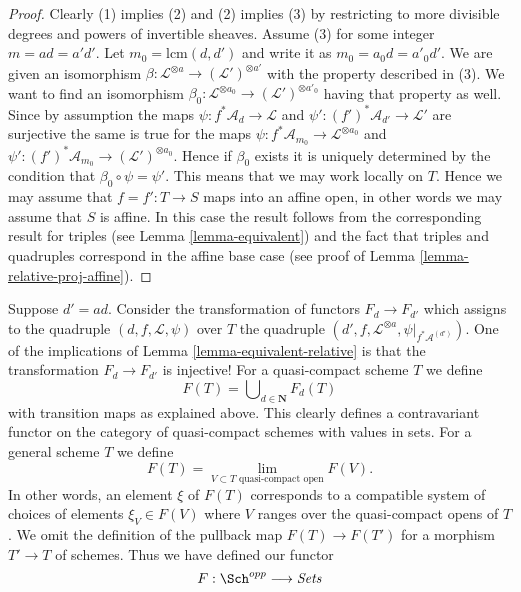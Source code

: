 \begin{proof}
Clearly (1) implies (2) and (2) implies (3) by restricting to
more divisible degrees and powers of invertible sheaves.
Assume (3) for some integer $m = ad = a'd'$. Let
$m_0 = \text{lcm}(d, d')$ and write it as $m_0 = a_0d = a'_0d'$.
We are given an isomorphism
$\beta : \mathcal{L}^{\otimes a} \to (\mathcal{L}')^{\otimes a'}$
with the property described in (3). We want to find an isomorphism
$\beta_0 : \mathcal{L}^{\otimes a_0} \to (\mathcal{L}')^{\otimes a'_0}$
having that property as well.
Since by assumption the maps $\psi : f^*\mathcal{A}_d \to \mathcal{L}$
and $\psi' : (f')^*\mathcal{A}_{d'} \to \mathcal{L}'$ are surjective the
same is true for the maps
$\psi : f^*\mathcal{A}_{m_0} \to \mathcal{L}^{\otimes a_0}$
and $\psi' : (f')^*\mathcal{A}_{m_0} \to (\mathcal{L}')^{\otimes a_0}$.
Hence if $\beta_0$ exists it is uniquely determined by the
condition that $\beta_0 \circ \psi = \psi'$. This means that
we may work locally on $T$. Hence we may assume that
$f = f' : T \to S$ maps into an affine open, in other words
we may assume that $S$ is affine. In this case the result follows
from the corresponding result for triples (see Lemma \ref{lemma-equivalent})
and the fact that triples and quadruples correspond in the
affine base case (see proof of Lemma \ref{lemma-relative-proj-affine}).
\end{proof}

\noindent
Suppose $d' = ad$. Consider the transformation of functors $F_d \to F_{d'}$
which assigns to the quadruple $(d, f, \mathcal{L}, \psi)$ over
$T$ the quadruple
$(d', f, \mathcal{L}^{\otimes a}, \psi|_{f^*\mathcal{A}^{(d')}})$.
One of the implications of Lemma \ref{lemma-equivalent-relative} is that the
transformation $F_d \to F_{d'}$ is injective!
For a quasi-compact scheme $T$ we define
$$
F(T) = \bigcup\nolimits_{d \in \mathbf{N}} F_d(T)
$$
with transition maps as explained above. This clearly defines a
contravariant functor on the category of quasi-compact schemes
with values in sets. For a general scheme
$T$ we define
$$
F(T)
=
\lim_{V \subset T\text{ quasi-compact open}} F(V).
$$
In other words, an element $\xi$ of $F(T)$ corresponds to a compatible system
of choices of elements $\xi_V \in F(V)$ where $V$ ranges over the
quasi-compact opens of $T$.
We omit the definition of the pullback map $F(T) \to F(T')$
for a morphism $T' \to T$ of schemes.
Thus we have defined our functor
\begin{equation}
\label{equation-proj}
F : \Sch^{opp} \longrightarrow \textit{Sets}
\end{equation}


